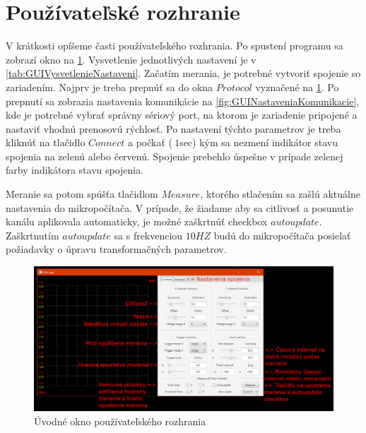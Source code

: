 \documentclass[main.tex]{subfiles}
\begin{document}
	\section{Používateľské rozhranie}
		\begin{multicols}{2}
			V krátkosti opíšeme časti používateľského rozhrania. Po spustení programu sa zobrazí okno na \cref{fig:GUIPrveOkno}. Vysvetlenie jednotlivých nastavení je v \cref{tab:GUIVysvetlenieNastaveni}. Začatím merania, je potrebné vytvoriť spojenie so zariadením. Najprv je treba prepnúť sa do okna $Protocol$ vyznačené na \cref{fig:GUIPrveOkno}. Po prepnutí sa zobrazia nastavenia komunikácie na \cref{fig:GUINastaveniaKomunikacie}, kde je potrebné vybrať správny sériový port, na ktorom je zariadenie pripojené a nastaviť vhodnú prenosovú rýchlosť. Po nastavení týchto parametrov je treba kliknúť na tlačidlo $Connect$ a počkať ($~1$sec) kým sa nezmení indikátor stavu spojenia na zelenú alebo červenú. Spojenie prebehlo úspešne v prípade zelenej farby indikátora stavu spojenia.
			
			Meranie sa potom spúšťa tlačidlom $Measure$, ktorého stlačením sa zašlú aktuálne nastavenia do mikropočítača. V prípade, že žiadame aby sa citlivosť a posunutie kanálu aplikovala automaticky, je možné zaškrtnúť checkbox $autoupdate$. Zaškrtnutím $autoupdate$ sa s frekvenciou $10HZ$ budú do mikropočítača posielať požiadavky o úpravu transformačných parametrov.  
			
			
		\end{multicols}
	
		\begin{figure}[h!]
			\centering
			\includegraphics[width=\linewidth]{../Obrazky/GUIPrveOkno}
			\caption{Úvodné okno používateľského rozhrania}
			\label{fig:GUIPrveOkno}
		\end{figure}
	
\end{document}
